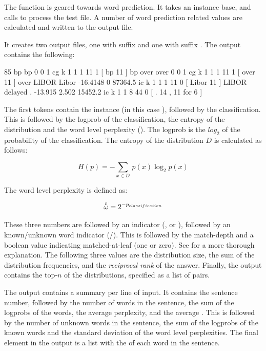 \documentclass[a4paper,10pt,twoside]{report}
\begin{document}
The  function is geared towards word prediction. It takes
an instance base, and calls \Timbl{} to process the test file. A
number of word prediction related values are calculated and written to
the output file.

It creates two output files, one with suffix  and one with
suffix .  The  output contains the following:

\begin{wout}{}
85 bp bp 0 0 1 cg k 1 1 1 11 1 [ bp 11 ]
bp over over 0 0 1 cg k 1 1 1 11 1 [ over 11 ]
over LIBOR Libor -16.4148 0 87364.5 ic k 1 1 1 11 0 [ Libor 11 ]
LIBOR delayed . -13.915 2.502 15452.2 ic k 1 1 8 44 0 [ . 14 , 11 for 6 ]
\end{wout}

The first tokens contain the instance (in this case ),
followed by the classification. This is followed by the logprob of the
classification, the entropy of the distribution and the word level
perplexity (\wlp{}). The logprob is the $log_2$ of the probability of the
classification. The entropy of the distribution $D$ is calculated as
follows:

\begin{equation}
H(p) = -\sum_{x \in D} \, p(x)\log_2 p(x)
\label{eq:entropy}
\end{equation}

The word level perplexity is defined as:

\begin{equation}
\accentset{p}{\omega}{} = 2^{-p_{classification}}
\label{eq:wlp}
\end{equation}

These three numbers are followed by an indicator (, 
or ), followed by an known/unknown word indicator
(/). This is followed by the match-depth and a boolean
value indicating matched-at-leaf (one or zero). See
\cite{Daelemans+09} for a more thorough explanation. The following
three values are the distribution size, the sum of the distribution
frequencies, and the \emph{reciprocal rank} of the answer. Finally,
the output contains the top-$n$ of the distributions, specified as a
list of  pairs.

The  output contains a summary per line of input. It
contains the sentence number, followed by the number of words in the
sentence, the sum of the logprobs of the words, the average
perplexity, and the average \wlp{}. This is followed by
the number of unknown words in the sentence, the sum of the logprobs
of the known words and the standard deviation of the word level
perplexities. The final element in the output is a list with the
\wlp{} of each word in the sentence.
\end{document}
